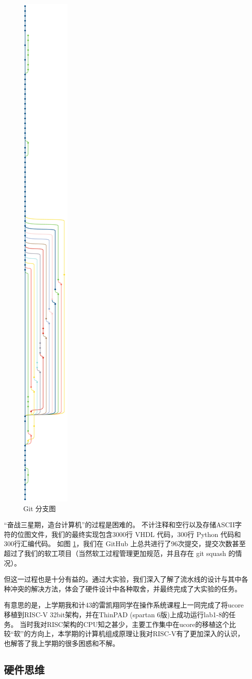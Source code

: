 \documentclass{article}
\begin{document}
\begin{figure}[ht]
\centering
\includegraphics[height=\textwidth,angle=270]{figures/git.pdf}
\caption{Git 分支图}
\label{fig:git}
\end{figure}

``奋战三星期，造台计算机''的过程是困难的。
不计注释和空行以及存储ASCII字符的位图文件，我们的最终实现包含$3000$行 VHDL 代码，$300$行 Python 代码和$300$行汇编代码。
如图 \ref{fig:git}，我们在 GitHub 上总共进行了$96$次提交，提交次数甚至超过了我们的软工项目（当然软工过程管理更加规范，并且存在 git squash 的情况）。

但这一过程也是十分有益的。通过大实验，我们深入了解了流水线的设计与其中各种冲突的解决方法，体会了硬件设计中各种取舍，并最终完成了大实验的任务。

有意思的是，上学期我和计43的雷凯翔同学在操作系统课程上一同完成了将ucore移植到RISC-V 32bit架构，并在ThinPAD (spartan 6版)上成功运行lab1-8的任务。
当时我对RISC架构的CPU知之甚少，主要工作集中在ucore的移植这个比较``软''的方向上，本学期的计算机组成原理让我对RISC-V有了更加深入的认识，也解答了我上学期的很多困惑和不解。

\subsection{硬件思维}
\end{document}
